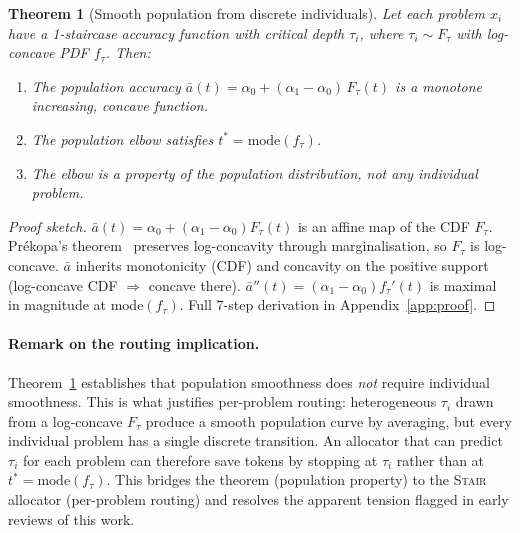 \documentclass{article}
\newcommand{\method}{\textsc{Stair}}
\newtheorem{theorem}{Theorem}
\begin{document}
\begin{theorem}[Smooth population from discrete individuals]
\label{thm:population}
Let each problem $x_i$ have a 1-staircase accuracy function with critical depth $\tau_i$, where $\tau_i \sim F_\tau$ with log-concave PDF $f_\tau$.  Then:
\begin{enumerate}[itemsep=1pt]
    \item The population accuracy $\bar{a}(t) = \alpha_0 + (\alpha_1 - \alpha_0)\, F_\tau(t)$ is a monotone increasing, concave function.
    \item The population elbow satisfies $t^* = \mathrm{mode}(f_\tau)$.
    \item The elbow is a property of the \emph{population distribution}, not any individual problem.
\end{enumerate}
\end{theorem}

\begin{proof}[Proof sketch]
$\bar{a}(t) = \alpha_0 + (\alpha_1{-}\alpha_0)F_\tau(t)$ is an affine map of the CDF $F_\tau$.  Pr\'ekopa's theorem~\citep{prekopa1973logconcave} preserves log-concavity through marginalisation, so $F_\tau$ is log-concave.  $\bar{a}$ inherits monotonicity (CDF) and concavity on the positive support (log-concave CDF $\Rightarrow$ concave there).  $\bar{a}''(t) = (\alpha_1{-}\alpha_0) f_\tau'(t)$ is maximal in magnitude at $\mathrm{mode}(f_\tau)$.  Full 7-step derivation in Appendix~\ref{app:proof}.
\end{proof}


\paragraph{Remark on the routing implication.}
Theorem~\ref{thm:population} establishes that population smoothness does \emph{not} require individual smoothness.  This is what justifies per-problem routing: heterogeneous $\tau_i$ drawn from a log-concave $F_\tau$ produce a smooth population curve by averaging, but every individual problem has a single discrete transition.  An allocator that can predict $\tau_i$ for each problem can therefore save tokens by stopping at $\tau_i$ rather than at $t^* = \mathrm{mode}(f_\tau)$.  This bridges the theorem (population property) to the \method{} allocator (per-problem routing) and resolves the apparent tension flagged in early reviews of this work.
\end{document}

